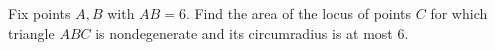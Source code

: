 Fix points $A,B$ with $AB=6$. Find the area of the locus of points $C$ for which triangle $ABC$ is nondegenerate and its circumradius is at most $6$.
